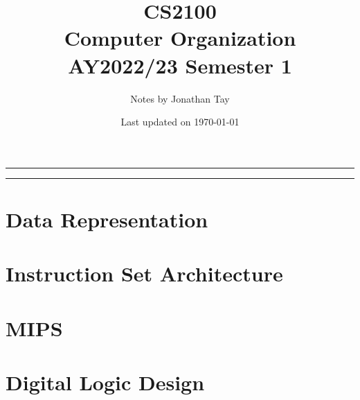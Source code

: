 \documentclass[twocolumn]{article}
\title{\vspace{-1cm}\textbf{CS2100 \\[0.25em] Computer Organization} \\[2em] \Large AY2022/23 Semester 1 \\[1em]}
\author{Notes by Jonathan Tay}
\date{Last updated on \today}
\newcommand{\pageline}[1]{\par\noindent\rule{\textwidth}{#1}} %
\begin{document}
    \onecolumn
    \linespread{1.4}\selectfont
    \maketitle
    \pageline{1.5pt}
    \tableofcontents
    \pageline{1.5pt}
    \linespread{1.08}\selectfont
    \twocolumn

    \newpage
        \part{Data Representation}
            
        \part{Instruction Set Architecture}
            
        \part{MIPS}
            
            
            
        \part{Digital Logic Design}
            
            
            
\end{document}
